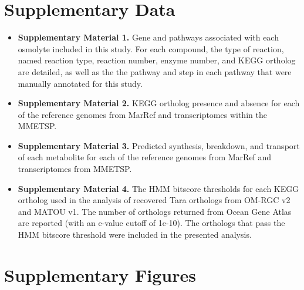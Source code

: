\documentclass[utf8]{frontiers_suppmat} %
\begin{document}
\onecolumn
{}

\title[Supplementary Material]{{}}

\maketitle

\section{Supplementary Data}
\begin{itemize}
    \item \textbf{Supplementary Material  1.} Gene and pathways associated with each osmolyte included in this study. For each compound, the type of reaction, named reaction type, reaction number, enzyme number, and KEGG ortholog are detailed, as well as the the pathway and step in each pathway that were manually annotated for this study. 
    \item \textbf{Supplementary Material  2.} KEGG ortholog presence and absence for each of the reference genomes from MarRef and transcriptomes within the MMETSP. 
    \item \textbf{Supplementary Material  3.} Predicted synthesis, breakdown, and transport of each metabolite for each of the reference genomes from MarRef and transcriptomes from MMETSP.
    \item \textbf{Supplementary Material  4.} The HMM bitscore thresholds for each KEGG ortholog used in the analysis of recovered Tara orthologs from OM-RGC v2 and MATOU v1. The number of orthologs returned from Ocean Gene Atlas are reported (with an e-value cutoff of 1e-10). The orthologs that pass the HMM bitscore threshold were included in the presented analysis. 
    
\end{itemize}
\section{Supplementary Figures}
\end{document}
